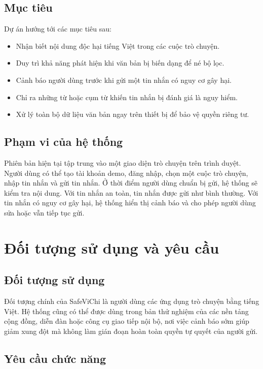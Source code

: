 \documentclass[12pt,a4paper]{article}
\begin{document}
\subsection{Mục tiêu}

Dự án hướng tới các mục tiêu sau:
\begin{itemize}
    \item Nhận biết nội dung độc hại tiếng Việt trong các cuộc trò chuyện.
    \item Duy trì khả năng phát hiện khi văn bản bị biến dạng để né bộ lọc.
    \item Cảnh báo người dùng trước khi gửi một tin nhắn có nguy cơ gây hại.
    \item Chỉ ra những từ hoặc cụm từ khiến tin nhắn bị đánh giá là nguy hiểm.
    \item Xử lý toàn bộ dữ liệu văn bản ngay trên thiết bị để bảo vệ quyền riêng tư.
\end{itemize}

\subsection{Phạm vi của hệ thống}

Phiên bản hiện tại tập trung vào một giao diện trò chuyện trên trình duyệt. Người dùng có thể tạo tài khoản demo, đăng nhập, chọn một cuộc trò chuyện, nhập tin nhắn và gửi tin nhắn. Ở thời điểm người dùng chuẩn bị gửi, hệ thống sẽ kiểm tra nội dung. Với tin nhắn an toàn, tin nhắn được gửi như bình thường. Với tin nhắn có nguy cơ gây hại, hệ thống hiển thị cảnh báo và cho phép người dùng sửa hoặc vẫn tiếp tục gửi.

\section{Đối tượng sử dụng và yêu cầu}

\subsection{Đối tượng sử dụng}

Đối tượng chính của SafeViChi là người dùng các ứng dụng trò chuyện bằng tiếng Việt. Hệ thống cũng có thể được dùng trong bản thử nghiệm của các nền tảng cộng đồng, diễn đàn hoặc công cụ giao tiếp nội bộ, nơi việc cảnh báo sớm giúp giảm xung đột mà không làm gián đoạn hoàn toàn quyền tự quyết của người gửi.

\subsection{Yêu cầu chức năng}
\end{document}
